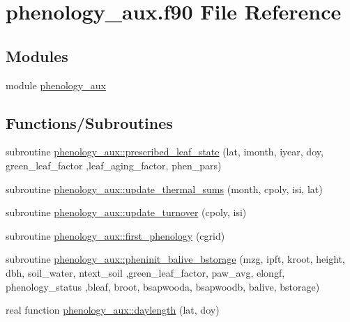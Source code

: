 \hypertarget{phenology__aux_8f90}{}\section{phenology\+\_\+aux.\+f90 File Reference}
\label{phenology__aux_8f90}
\subsection*{Modules}
\begin{DoxyCompactItemize}
\item 
module \hyperlink{namespacephenology__aux}{phenology\+\_\+aux}
\end{DoxyCompactItemize}
\subsection*{Functions/\+Subroutines}
\begin{DoxyCompactItemize}
\item 
subroutine \hyperlink{namespacephenology__aux_ac2a698e44f1d2308f845a66ad92600e1}{phenology\+\_\+aux\+::prescribed\+\_\+leaf\+\_\+state} (lat, imonth, iyear, doy, green\+\_\+leaf\+\_\+factor                                                                                                                                                                                                       ,leaf\+\_\+aging\+\_\+factor, phen\+\_\+pars)
\item 
subroutine \hyperlink{namespacephenology__aux_a227cf46507f7976ea4dd53e724e157c0}{phenology\+\_\+aux\+::update\+\_\+thermal\+\_\+sums} (month, cpoly, isi, lat)
\item 
subroutine \hyperlink{namespacephenology__aux_a7a199ed988a720b2e56c3b5e1407995a}{phenology\+\_\+aux\+::update\+\_\+turnover} (cpoly, isi)
\item 
subroutine \hyperlink{namespacephenology__aux_ac9c11ddf83cd16439262bc9c7c72bf2e}{phenology\+\_\+aux\+::first\+\_\+phenology} (cgrid)
\item 
subroutine \hyperlink{namespacephenology__aux_a678dc0aeea995ed48f816c0588d15965}{phenology\+\_\+aux\+::pheninit\+\_\+balive\+\_\+bstorage} (mzg, ipft, kroot, height, dbh, soil\+\_\+water, ntext\+\_\+soil                                                                                                                                                                   ,green\+\_\+leaf\+\_\+factor, paw\+\_\+avg, elongf, phenology\+\_\+status                                                                                                                                                           ,bleaf, broot, bsapwooda, bsapwoodb, balive, bstorage)
\item 
real function \hyperlink{namespacephenology__aux_a6fd36340ae7c75f11750adbf09d700d9}{phenology\+\_\+aux\+::daylength} (lat, doy)
\end{DoxyCompactItemize}
